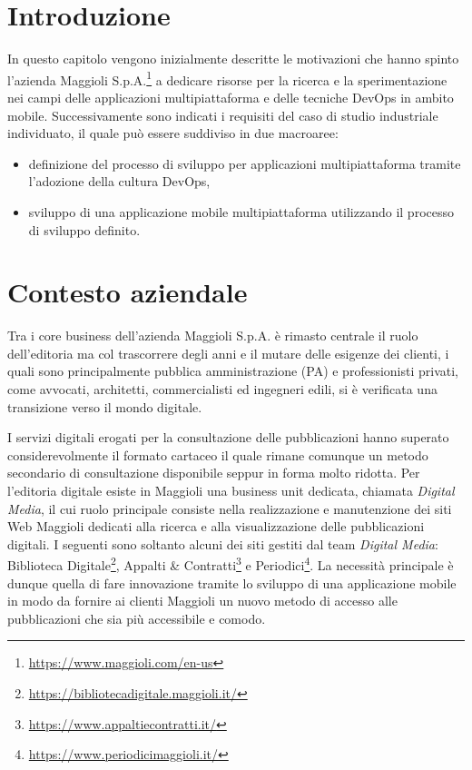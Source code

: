 
\section{Introduzione}
In questo capitolo vengono inizialmente descritte le motivazioni che hanno spinto l'azienda Maggioli S.p.A.\footnote{\href{https://www.maggioli.com/en-us}{https://www.maggioli.com/en-us}} a dedicare risorse per la ricerca e la sperimentazione nei campi delle applicazioni multipiattaforma e delle tecniche DevOps in ambito mobile. Successivamente sono indicati i requisiti del caso di studio industriale individuato, il quale può essere suddiviso in due macroaree:
\begin{itemize}
    \item definizione del processo di sviluppo per applicazioni multipiattaforma tramite l'adozione della cultura DevOps,
    \item sviluppo di una applicazione mobile multipiattaforma utilizzando il processo di sviluppo definito.
\end{itemize}

\section{Contesto aziendale}
Tra i core business dell'azienda Maggioli S.p.A. è rimasto centrale il ruolo dell'editoria ma col trascorrere degli anni e il mutare delle esigenze dei clienti, i quali sono principalmente pubblica amministrazione (PA) e professionisti privati, come avvocati, architetti, commercialisti ed ingegneri edili, si è verificata una transizione verso il mondo digitale.

I servizi digitali erogati per la consultazione delle pubblicazioni hanno superato considerevolmente il formato cartaceo il quale rimane comunque un metodo secondario di consultazione disponibile seppur in forma molto ridotta. Per l'editoria digitale esiste in Maggioli una business unit dedicata, chiamata \textit{Digital Media}, il cui ruolo principale consiste nella realizzazione e manutenzione dei siti Web Maggioli dedicati alla ricerca e alla visualizzazione delle pubblicazioni digitali. I seguenti sono soltanto alcuni dei siti gestiti dal team \textit{Digital Media}: Biblioteca Digitale\footnote{\href{https://bibliotecadigitale.maggioli.it/}{https://bibliotecadigitale.maggioli.it/}}, Appalti \& Contratti\footnote{\href{https://www.appaltiecontratti.it/}{https://www.appaltiecontratti.it/}} e Periodici\footnote{\href{https://www.periodicimaggioli.it/}{https://www.periodicimaggioli.it/}}. La necessità principale è dunque quella di fare innovazione tramite lo sviluppo di una applicazione mobile in modo da fornire ai clienti Maggioli un nuovo metodo di accesso alle pubblicazioni che sia più accessibile e comodo. 

